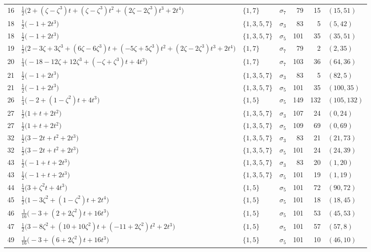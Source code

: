 \documentclass[11pt]{article}
\begin{document}
{\begin{longtable}{@{}r>{\raggedright\arraybackslash}p{}lcrrl@{}}
16 & $\tfrac{1}{2}\bigl(2+(\zeta-\zeta^3)t+(\zeta-\zeta^3)t^{2}+(2\zeta-2\zeta^3)t^{3}+2t^{4}\bigr)$ & $\{1,7\}$ & $\sigma_{7}$ & 79 & 15 & $(15,51)$\\
18 & $\tfrac{1}{2}\bigl(-1+2t^{3}\bigr)$ & $\{1,3,5,7\}$ & $\sigma_{3}$ & 83 & 5 & $(5,42)$\\
18 & $\tfrac{1}{2}\bigl(-1+2t^{3}\bigr)$ & $\{1,3,5,7\}$ & $\sigma_{5}$ & 101 & 35 & $(35,51)$\\
19 & $\tfrac{1}{2}\bigl(2-3\zeta+3\zeta^3+(6\zeta-6\zeta^3)t+(-5\zeta+5\zeta^3)t^{2}+(2\zeta-2\zeta^3)t^{3}+2t^{4}\bigr)$ & $\{1,7\}$ & $\sigma_{7}$ & 79 & 2 & $(2,35)$\\
20 & $\tfrac{1}{4}\bigl(-18-12\zeta+12\zeta^3+(-\zeta+\zeta^3)t+4t^{3}\bigr)$ & $\{1,7\}$ & $\sigma_{7}$ & 103 & 36 & $(64,36)$\\
21 & $\tfrac{1}{2}\bigl(-1+2t^{3}\bigr)$ & $\{1,3,5,7\}$ & $\sigma_{3}$ & 83 & 5 & $(82,5)$\\
21 & $\tfrac{1}{2}\bigl(-1+2t^{3}\bigr)$ & $\{1,3,5,7\}$ & $\sigma_{5}$ & 101 & 35 & $(100,35)$\\
26 & $\tfrac{1}{4}\bigl(-2+(1-\zeta^2)t+4t^{3}\bigr)$ & $\{1,5\}$ & $\sigma_{5}$ & 149 & 132 & $(105,132)$\\
27 & $\tfrac{1}{2}\bigl(1+t+2t^{2}\bigr)$ & $\{1,3,5,7\}$ & $\sigma_{3}$ & 107 & 24 & $(0,24)$\\
27 & $\tfrac{1}{2}\bigl(1+t+2t^{2}\bigr)$ & $\{1,3,5,7\}$ & $\sigma_{5}$ & 109 & 69 & $(0,69)$\\
32 & $\tfrac{1}{2}\bigl(3-2t+t^{2}+2t^{3}\bigr)$ & $\{1,3,5,7\}$ & $\sigma_{3}$ & 83 & 21 & $(21,73)$\\
32 & $\tfrac{1}{2}\bigl(3-2t+t^{2}+2t^{3}\bigr)$ & $\{1,3,5,7\}$ & $\sigma_{5}$ & 101 & 24 & $(24,39)$\\
43 & $\tfrac{1}{2}\bigl(-1+t+2t^{3}\bigr)$ & $\{1,3,5,7\}$ & $\sigma_{3}$ & 83 & 20 & $(1,20)$\\
43 & $\tfrac{1}{2}\bigl(-1+t+2t^{3}\bigr)$ & $\{1,3,5,7\}$ & $\sigma_{5}$ & 101 & 19 & $(1,19)$\\
44 & $\tfrac{1}{4}\bigl(3+\zeta^2t+4t^{3}\bigr)$ & $\{1,5\}$ & $\sigma_{5}$ & 101 & 72 & $(90,72)$\\
45 & $\tfrac{1}{2}\bigl(1-3\zeta^2+(1-\zeta^2)t+2t^{4}\bigr)$ & $\{1,5\}$ & $\sigma_{5}$ & 101 & 18 & $(18,45)$\\
46 & $\tfrac{1}{16}\bigl(-3+(2+2\zeta^2)t+16t^{3}\bigr)$ & $\{1,5\}$ & $\sigma_{5}$ & 101 & 53 & $(45,53)$\\
47 & $\tfrac{1}{2}\bigl(3-8\zeta^2+(10+10\zeta^2)t+(-11+2\zeta^2)t^{2}+2t^{3}\bigr)$ & $\{1,5\}$ & $\sigma_{5}$ & 101 & 57 & $(57,8)$\\
49 & $\tfrac{1}{16}\bigl(-3+(6+2\zeta^2)t+16t^{3}\bigr)$ & $\{1,5\}$ & $\sigma_{5}$ & 101 & 10 & $(46,10)$\\
\end{longtable}
}
\end{document}
